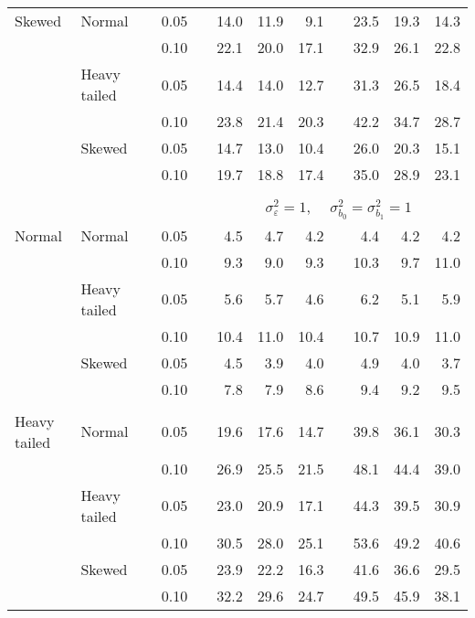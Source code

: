\begin{table}[ht]
\begin{scriptsize}
\begin{center}
\begin{tabular}{ll p{.1cm} c p{.1cm} rrr p{.1cm} rrr}
Skewed       & Normal       && 0.05 &&   14.0 & 11.9 & 9.1 &   & 23.5 & 19.3 & 14.3 \\ 
             &              && 0.10 &&   22.1 & 20.0 & 17.1 &   & 32.9 & 26.1 & 22.8 \\ 
             & Heavy tailed && 0.05 &&   14.4 & 14.0 & 12.7 &   & 31.3 & 26.5 & 18.4 \\ 
             &              && 0.10 &&   23.8 & 21.4 & 20.3 &   & 42.2 & 34.7 & 28.7 \\ 
             & Skewed       && 0.05 &&   14.7 & 13.0 & 10.4 &   & 26.0 & 20.3 & 15.1 \\ 
             &              && 0.10 &&   19.7 & 18.8 & 17.4 &   & 35.0 & 28.9 & 23.1 \\ 

&&&&&&&&&&&\\
& && && \multicolumn{7}{c}{$\sigma_{\varepsilon}^2 = 1$, \ \ $\sigma_{b_0}^2 = \sigma_{b_1}^2 = 1$} \\ \cline{6-12}
\rowcolor{gray!20}Normal       & Normal       && 0.05 &&   4.5 & 4.7 & 4.2 &   & 4.4 & 4.2 & 4.2 \\ 
\rowcolor{gray!20}             &              && 0.10 &&   9.3 & 9.0 & 9.3 &   & 10.3 & 9.7 & 11.0 \\ 
\rowcolor{gray!20}             & Heavy tailed && 0.05 &&   5.6 & 5.7 & 4.6 &   & 6.2 & 5.1 & 5.9 \\ 
\rowcolor{gray!20}             &              && 0.10 &&   10.4 & 11.0 & 10.4 &   & 10.7 & 10.9 & 11.0 \\ 
\rowcolor{gray!20}             & Skewed       && 0.05 &&   4.5 & 3.9 & 4.0 &   & 4.9 & 4.0 & 3.7 \\ 
\rowcolor{gray!20}             &              && 0.10 &&   7.8 & 7.9 & 8.6 &   & 9.4 & 9.2 & 9.5 \\ 
&&&&&&&&&&&\\
Heavy tailed & Normal       && 0.05 &&   19.6 & 17.6 & 14.7 &   & 39.8 & 36.1 & 30.3 \\ 
             &              && 0.10 &&   26.9 & 25.5 & 21.5 &   & 48.1 & 44.4 & 39.0 \\ 
             & Heavy tailed && 0.05 &&   23.0 & 20.9 & 17.1 &   & 44.3 & 39.5 & 30.9 \\ 
             &              && 0.10 &&   30.5 & 28.0 & 25.1 &   & 53.6 & 49.2 & 40.6 \\ 
             & Skewed       && 0.05 &&   23.9 & 22.2 & 16.3 &   & 41.6 & 36.6 & 29.5 \\ 
             &              && 0.10 &&   32.2 & 29.6 & 24.7 &   & 49.5 & 45.9 & 38.1 \\ 

\end{tabular}
\end{center}
\end{scriptsize}
\end{table}

